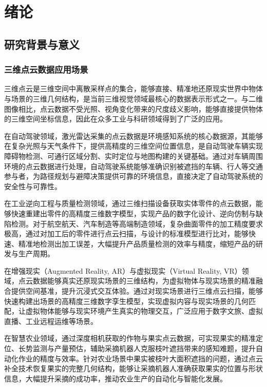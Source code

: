 \chapter{绪论}
\label{cha:intro}

\section{研究背景与意义}

\subsection{三维点云数据应用场景}
三维点云是三维空间中离散采样点的集合，能够直接、精准地还原现实世界中物体与场景的三维几何结构，是当前三维视觉领域最核心的数据表示形式之一。与二维图像相比，点云数据不受光照、视角变化带来的尺度歧义影响，能够直接提供物体的三维空间坐标信息，因此在众多工业与科研领域得到了广泛的应用。

在自动驾驶领域，激光雷达采集的点云数据是环境感知系统的核心数据源，其能够在复杂光照与天气条件下，提供高精度的三维空间位置信息，是自动驾驶车辆实现障碍物检测、可通行区域分割、实时定位与地图构建的关键基础\cite{zhai2023improved}。通过对车辆周围环境的点云数据进行处理，自动驾驶系统能够准确识别被遮挡的车辆、行人等交通参与者，为路径规划与避障决策提供可靠的环境信息，直接决定了自动驾驶系统的安全性与可靠性。

在工业逆向工程与质量检测领域，通过三维扫描设备获取实体零件的点云数据，能够快速重建出零件的高精度三维数字模型，实现产品的数字化设计、逆向仿制与缺陷检测。对于航空航天、汽车制造等高端制造领域，复杂曲面零件的加工精度要求极高，通过对加工后的零件进行点云扫描，与设计的标准模型进行比对，能够快速、精准地检测出加工误差，大幅提升产品质量检测的效率与精度，缩短产品的研发与生产周期。

在增强现实（Augmented Reality, AR）与虚拟现实（Virtual Reality, VR）领域，点云数据能够真实还原现实场景的三维结构，为虚拟物体与现实场景的精准融合提供空间基准，提升沉浸式交互体验。通过对现实场景进行三维点云扫描，能够快速构建出场景的高精度三维数字孪生模型，实现虚拟内容与现实场景的几何匹配，让虚拟物体能够与现实环境产生真实的物理交互，广泛应用于数字文旅、虚拟直播、工业远程运维等场景。

在智慧农业领域，通过深度相机获取的作物与果实点云数据，可实现果实的精准定位、长势监测与产量预估，辅助采摘机器人克服枝叶遮挡带来的感知难题，提升自动化作业的精度与效率\cite{zhai2023improved}。针对农业场景中果实被枝叶大面积遮挡的问题，通过点云补全技术恢复果实的完整几何结构，能够让采摘机器人准确获取果实的位置与形状信息，大幅提升采摘的成功率，推动农业生产的自动化与智能化发展。

